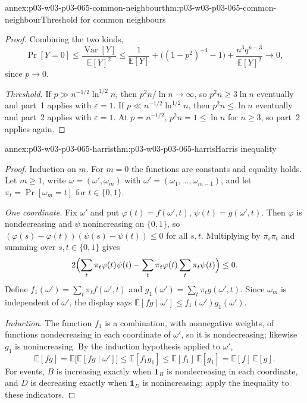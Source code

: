 \begin{annexitem}{annex:p03-w03-p03-065-common-neighbour}{thm:p03-w03-p03-065-common-neighbour}{Threshold for common neighbours}
\begin{proof}
Combining the two kinds,
\[
  \Pr[Y=0]\leq\frac{\operatorname{Var}[Y]}{\mathbb E[Y]^2}
  \leq\frac1{\mathbb E[Y]}+\bigl((1-p^2)^{-4}-1\bigr)
  +\frac{n^3q^{n-3}}{\mathbb E[Y]^2}\to0 ,
\]
since \(p\to0\).

\emph{Threshold.}  If \(p\gg n^{-1/2}\ln^{1/2}n\), then \(p^2n/\ln n\to
\infty\), so \(p^2n\geq3\ln n\) eventually and part~1 applies with
\(\varepsilon=1\).  If \(p\ll n^{-1/2}\ln^{1/2}n\), then
\(p^2n\leq\ln n\) eventually and part~2 applies with \(\varepsilon=1\).  At
\(p=n^{-1/2}\), \(p^2n=1\leq\ln n\) for \(n\geq3\), so part~2 applies again.
\end{proof}
\end{annexitem}

\begin{annexitem}{annex:p03-w03-p03-065-harris}{thm:p03-w03-p03-065-harris}{Harris inequality}
\begin{proof}
Induction on \(m\).  For \(m=0\) the functions are constants and equality
holds.  Let \(m\geq1\), write \(\omega=(\omega',\omega_m)\) with
\(\omega'=(\omega_1,\ldots,\omega_{m-1})\), and let
\(\pi_t=\Pr[\omega_m=t]\) for \(t\in\{0,1\}\).

\emph{One coordinate.}  Fix \(\omega'\) and put \(\varphi(t)=f(\omega',t)\),
\(\psi(t)=g(\omega',t)\).  Then \(\varphi\) is nondecreasing and \(\psi\)
nonincreasing on \(\{0,1\}\), so
\((\varphi(s)-\varphi(t))(\psi(s)-\psi(t))\leq0\) for all \(s,t\).
Multiplying by \(\pi_s\pi_t\) and summing over \(s,t\in\{0,1\}\) gives
\[
  2\Bigl(\sum_t\pi_t\varphi(t)\psi(t)
  -\sum_t\pi_t\varphi(t)\sum_t\pi_t\psi(t)\Bigr)\leq0 .
\]
Define \(f_1(\omega')=\sum_t\pi_tf(\omega',t)\) and
\(g_1(\omega')=\sum_t\pi_tg(\omega',t)\).  Since \(\omega_m\) is independent
of \(\omega'\), the display says
\(\mathbb E[fg\mid\omega']\leq f_1(\omega')g_1(\omega')\).

\emph{Induction.}  The function \(f_1\) is a combination, with nonnegative
weights, of functions nondecreasing in each coordinate of \(\omega'\), so it
is nondecreasing; likewise \(g_1\) is nonincreasing.  By the induction
hypothesis applied to \(\omega'\),
\[
  \mathbb E[fg]=\mathbb E\bigl[\mathbb E[fg\mid\omega']\bigr]
  \leq\mathbb E[f_1g_1]\leq\mathbb E[f_1]\,\mathbb E[g_1]
  =\mathbb E[f]\,\mathbb E[g].
\]
For events, \(B\) is increasing exactly when \(\mathbf 1_B\) is
nondecreasing in each coordinate, and \(D\) is decreasing exactly when
\(\mathbf 1_D\) is nonincreasing; apply the inequality to these indicators.
\end{proof}
\end{annexitem}

